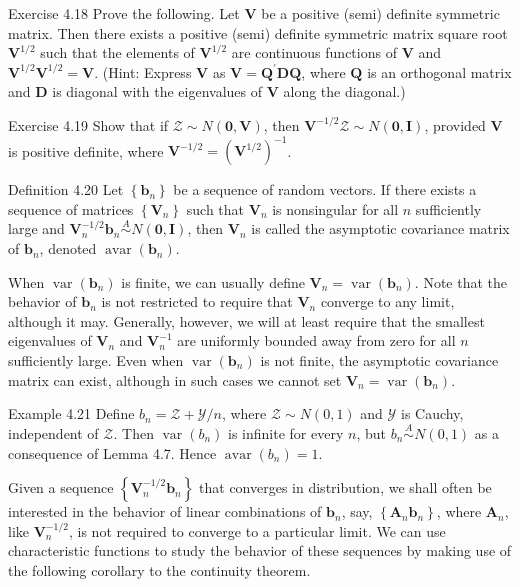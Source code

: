 \documentclass[10pt]{article}
\begin{document}
Exercise 4.18 Prove the following. Let $\mathbf{V}$ be a positive (semi) definite symmetric matrix. Then there exists a positive (semi) definite symmetric matrix square root $\mathbf{V}^{1 / 2}$ such that the elements of $\mathbf{V}^{1 / 2}$ are continuous functions of $\mathbf{V}$ and $\mathbf{V}^{1 / 2} \mathbf{V}^{1 / 2}=\mathbf{V}$. (Hint: Express $\mathbf{V}$ as $\mathbf{V}=\mathbf{Q}^{\prime} \mathbf{D Q}$, where $\mathbf{Q}$ is an orthogonal matrix and $\mathbf{D}$ is diagonal with the eigenvalues of $\mathbf{V}$ along the diagonal.)

Exercise 4.19 Show that if $\mathcal{Z} \sim N(\mathbf{0}, \mathbf{V})$, then $\mathbf{V}^{-1 / 2} \mathcal{Z} \sim N(\mathbf{0}, \mathbf{I})$, provided $\mathbf{V}$ is positive definite, where $\mathbf{V}^{-1 / 2}=\left(\mathbf{V}^{1 / 2}\right)^{-1}$.

Definition 4.20 Let $\left\{\mathbf{b}_{n}\right\}$ be a sequence of random vectors. If there exists a sequence of matrices $\left\{\mathbf{V}_{n}\right\}$ such that $\mathbf{V}_{n}$ is nonsingular for all $n$ sufficiently large and $\mathbf{V}_{n}^{-1 / 2} \mathbf{b}_{n} \stackrel{A}{\sim} N(\mathbf{0}, \mathbf{I})$, then $\mathbf{V}_{n}$ is called the asymptotic covariance matrix of $\mathbf{b}_{n}$, denoted $\operatorname{avar}\left(\mathbf{b}_{n}\right)$.

When $\operatorname{var}\left(\mathbf{b}_{n}\right)$ is finite, we can usually define $\mathbf{V}_{n}=\operatorname{var}\left(\mathbf{b}_{n}\right)$. Note that the behavior of $\mathbf{b}_{n}$ is not restricted to require that $\mathbf{V}_{n}$ converge to any limit, although it may. Generally, however, we will at least require that the smallest eigenvalues of $\mathbf{V}_{n}$ and $\mathbf{V}_{n}^{-1}$ are uniformly bounded away from zero for all $n$ sufficiently large. Even when $\operatorname{var}\left(\mathbf{b}_{n}\right)$ is not finite, the asymptotic covariance matrix can exist, although in such cases we cannot set $\mathbf{V}_{n}= \operatorname{var}\left(\mathbf{b}_{n}\right)$.

Example 4.21 Define $b_{n}=\mathcal{Z}+\mathcal{Y} / n$, where $\mathcal{Z} \sim N(0,1)$ and $\mathcal{Y}$ is Cauchy, independent of $\mathcal{Z}$. Then $\operatorname{var}\left(b_{n}\right)$ is infinite for every $n$, but $b_{n} \stackrel{A}{\sim} N(0,1)$ as a consequence of Lemma 4.7. Hence $\operatorname{avar}\left(b_{n}\right)=1$.

Given a sequence $\left\{\mathbf{V}_{n}^{-1 / 2} \mathbf{b}_{n}\right\}$ that converges in distribution, we shall often be interested in the behavior of linear combinations of $\mathbf{b}_{n}$, say, $\left\{\mathbf{A}_{n} \mathbf{b}_{n}\right\}$, where $\mathbf{A}_{n}$, like $\mathbf{V}_{n}^{-1 / 2}$, is not required to converge to a particular limit. We can use characteristic functions to study the behavior of these sequences by making use of the following corollary to the continuity theorem.
\end{document}
